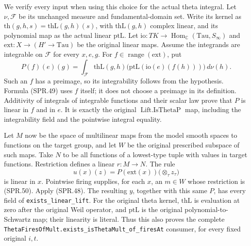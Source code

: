 \documentclass[11pt,a4paper]{article}
\numberwithin{equation}{section}
\theoremstyle{remark}\newtheorem{remark}[theorem]{Remark}
\begin{document}
We verify every input when using this choice for the actual
theta integral.  Let \(\nu,\mathcal F\) be its unchanged
measure and fundamental-domain set.  Write its kernel as
\(\mathrm{th}(g,h,s)=\mathrm{thL}(g,h)(s)\), with
\(\mathrm{thL}(g,h)\) complex linear, and its polynomial map as
the actual linear \(\mathrm{ptL}\).
Let \(\mathrm{io}:TK\to\operatorname{Hom}_{\mathbb C}
(\mathrm{Tau},S_\infty)\) and
\(\mathrm{ext}:X\to(H'\to\mathrm{Tau})\) be the original
linear maps.  Assume the integrands are integrable on
\(\mathcal F\) for every \(x,e,g\).
For \(f\in\operatorname{range}(\mathrm{ext})\), put
\[
 P(f)(e)(g)=\int_{\mathcal F}
   \mathrm{thL}(g,h)
     \bigl(\mathrm{ptL}(\mathrm{io}(e)(f(h)))\bigr)\,d\nu(h).
 \tag{SPR.49}
\]
Such an \(f\) has a preimage, so its integrability follows from
the hypothesis.  Formula (SPR.49) uses \(f\) itself; it does not
choose a preimage in its definition.  Additivity of integrals
of integrable functions and their scalar law prove that \(P\)
is linear in \(f\) and in \(e\).  It is exactly the original
\(\operatorname{Lift.IsThetaP}\) map, including the integrability
field and the pointwise integral equality.

Let \(M\) now be the space of multilinear maps from the model
smooth spaces to functions on the target group, and let
\(W\) be the original prescribed subspace of such maps.
Take \(N\) to be all functions of a lowest-type tuple with
values in target functions.  Restriction defines a linear
\(r:M\to N\).  The rule
\[
 u(x)(z)=P(\mathrm{ext}(x))
                       \bigl(\mathop{\otimes}_\tau z_\tau\bigr)
 \tag{SPR.50}
\]
is linear in \(x\).  Pointwise firing supplies, for each \(x\),
an \(m\in W\) whose restriction is (SPR.50).  Apply (SPR.48).
The resulting \(y\), together with this same \(P\), has every
field of \texttt{exists\_\allowbreak linear\_\allowbreak lift}.
For the original theta kernel, \(\mathrm{thL}\) is evaluation
at zero after the original Weil operator, and
\(\mathrm{ptL}\) is the original polynomial-to-Schwartz map;
their linearity is literal.  Thus this also proves the complete
\texttt{ThetaFiresOfMult.\allowbreak exists\_\allowbreak isThetaMult\_\allowbreak of\_\allowbreak firesAt}
consumer, for every fixed original \(i,t\).

\end{document}
